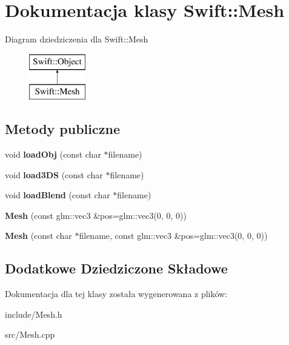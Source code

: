\hypertarget{class_swift_1_1_mesh}{\section{Dokumentacja klasy Swift\-:\-:Mesh}
\label{class_swift_1_1_mesh}
}
Diagram dziedziczenia dla Swift\-:\-:Mesh\begin{figure}[H]
\begin{center}
\leavevmode
\includegraphics[height=2.000000cm]{class_swift_1_1_mesh}
\end{center}
\end{figure}
\subsection*{Metody publiczne}
\begin{DoxyCompactItemize}
\item 
\hypertarget{class_swift_1_1_mesh_ac6572f81c093dce1a16a452eaf2121dd}{void {\bfseries load\-Obj} (const char $\ast$filename)}\label{class_swift_1_1_mesh_ac6572f81c093dce1a16a452eaf2121dd}

\item 
\hypertarget{class_swift_1_1_mesh_a9fdf742b0dda4c81ba421d131feb4007}{void {\bfseries load3\-D\-S} (const char $\ast$filename)}\label{class_swift_1_1_mesh_a9fdf742b0dda4c81ba421d131feb4007}

\item 
\hypertarget{class_swift_1_1_mesh_ac0294d75b61631d73dbef1925de2473c}{void {\bfseries load\-Blend} (const char $\ast$filename)}\label{class_swift_1_1_mesh_ac0294d75b61631d73dbef1925de2473c}

\item 
\hypertarget{class_swift_1_1_mesh_adaf53c5aa90edbba32b125339192fec5}{{\bfseries Mesh} (const glm\-::vec3 \&pos=glm\-::vec3(0, 0, 0))}\label{class_swift_1_1_mesh_adaf53c5aa90edbba32b125339192fec5}

\item 
\hypertarget{class_swift_1_1_mesh_ac613e4ca2c1bbb16b885b4a5bff8840c}{{\bfseries Mesh} (const char $\ast$filename, const glm\-::vec3 \&pos=glm\-::vec3(0, 0, 0))}\label{class_swift_1_1_mesh_ac613e4ca2c1bbb16b885b4a5bff8840c}

\end{DoxyCompactItemize}
\subsection*{Dodatkowe Dziedziczone Składowe}


Dokumentacja dla tej klasy została wygenerowana z plików\-:\begin{DoxyCompactItemize}
\item 
include/Mesh.\-h\item 
src/Mesh.\-cpp\end{DoxyCompactItemize}
